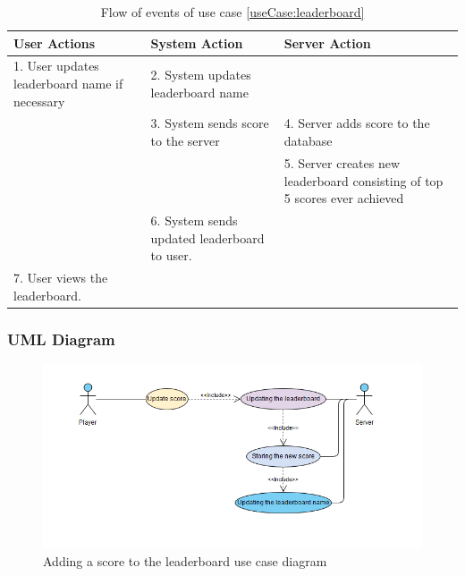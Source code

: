 \documentclass[10pt]{article}
\begin{document}
		\begin{table}[H]
		\label{eventFlow:leaderboard} 
			\begin{tabular}{|p{45mm}|p{45mm}|p{45mm}}
User Actions                                  & System Action                                & 
Server Action                                                              \\
\hline
1. User updates leaderboard name if necessary & 2. System updates leaderboard name           &                                                                            \\
                                              & 3. System sends score to the server          & 4. Server adds score to the database                                       \\
                                              &                                              & 5. Server creates new leaderboard consisting of top 5 scores ever achieved \\
                                              & 6. System sends updated leaderboard to user. &                                                                            \\
7. User views the leaderboard.                &                                              &                                                                           
			\end{tabular}
		\caption{Flow of events of use case \ref{useCase:leaderboard}}
		\end{table}
		\subsubsection{UML Diagram}
		\begin{figure}[H]
			\includegraphics[width=\linewidth]{latex_images/LeaderboardUseCase.png}
			\caption{Adding a score to the leaderboard use case diagram}
		\end{figure}
\end{document}
